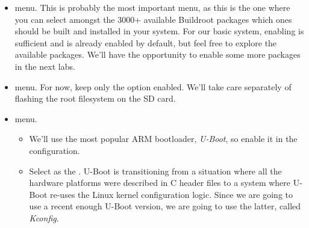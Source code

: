 \begin{itemize}
\begin{itemize}
  \item On ARM64, all platforms use the {\em Device Tree} to
    describe the hardware. The BeaglePlay is in this situation, so
    you'll have to enable the 
    option. At
    \url{https://git.kernel.org/cgit/linux/kernel/git/torvalds/linux.git/tree/arch/arm64/boot/dts/ti/?id=v6.12},
    you can see the list of Device Tree files for TI ARM64 platforms.
    The one for the BeaglePlay is .
    Back in Buildroot, enable 
    and type  as the .

  \item The kernel configuration for this platform requires having
    OpenSSL available on the host machine. To avoid depending on the
    OpenSSL development files installed by your host machine Linux
    distribution, Buildroot can build its own version: just enable the
     option.

  \end{itemize}

\item {} menu. This is probably the most important
  menu, as this is the one where you can select amongst the 3000+
  available Buildroot packages which ones should be built and
  installed in your system. For our basic system, enabling
   is sufficient and is already enabled by default, but
  feel free to explore the available packages. We'll have the
  opportunity to enable some more packages in the next labs.

\item {} menu. For now, keep only the  option enabled. We'll take care separately of
  flashing the root filesystem on the SD card.

\item {} menu.

  \begin{itemize}

  \item We'll use the most popular ARM bootloader, {\em U-Boot}, so
    enable it in the configuration.

  \item Select  as the . U-Boot is
    transitioning from a situation where all the hardware platforms
    were described in C header files to a system where U-Boot re-uses
    the Linux kernel configuration logic. Since we are going to use a
    recent enough U-Boot version, we are going to use the latter,
    called {\em Kconfig}.


\end{itemize}
\end{itemize}
